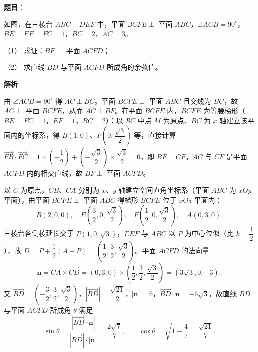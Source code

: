 \begin{answer}

\textbf{题目}：

如图，在三棱台 \(ABC-DEF\) 中，平面 \(BCFE\perp\) 平面 \(ABC\)，\(\angle ACB=90^{\circ}\)，\(BE=EF=FC=1\)，\(BC=2\)，\(AC=3\)。

（1） 求证：\(BF\perp\) 平面 \(ACFD\)；

（2） 求直线 \(BD\) 与平面 \(ACFD\) 所成角的余弦值。
\nopagebreak[4]
\begin{center}\end{center}
\nopagebreak[4]
\textbf{解析}


由 \(\angle ACB=90^{\circ}\) 得 \(AC\perp BC\)。平面 \(BCFE\perp\) 平面 \(ABC\) 且交线为 \(BC\)，故 \(AC\perp\) 平面 \(BCFE\)，从而 \(AC\perp BF\)。在平面 \(BCFE\) 内，\(BCFE\) 为等腰梯形（\(BE=FC=1\)，\(EF=1\)，\(BC=2\)）：以 \(BC\) 中点 \(M\) 为原点、\(BC\) 为 \(x\) 轴建立该平面内的坐标系，得 \(B(1,0)\)、\(F\left(0,\dfrac{\sqrt{3}}{2}\right)\) 等，直接计算 \(\overrightarrow{FB}\cdot\overrightarrow{FC}=1\times\left(-\dfrac{1}{2}\right)+\left(-\dfrac{\sqrt{3}}{2}\right)\times\dfrac{\sqrt{3}}{2}=0\)，即 \(BF\perp CF\)。\(AC\) 与 \(CF\) 是平面 \(ACFD\) 内的相交直线，故 \(BF\perp\) 平面 \(ACFD\)。


以 \(C\) 为原点，\(CB\)、\(CA\) 分别为 \(x\)、\(y\) 轴建立空间直角坐标系（平面 \(ABC\) 为 \(xOy\) 平面），由平面 \(BCFE\perp\) 平面 \(ABC\) 得梯形 \(BCFE\) 位于 \(xOz\) 平面内：
\nopagebreak[4]
\[
B(2,0,0),\quad E\left(\frac{3}{2},0,\frac{\sqrt{3}}{2}\right),\quad F\left(\frac{1}{2},0,\frac{\sqrt{3}}{2}\right),\quad A(0,3,0).
\]
三棱台各侧棱延长交于 \(P(1,0,\sqrt{3})\)，\(DEF\) 与 \(ABC\) 以 \(P\) 为中心位似（比 \(k=\dfrac{1}{2}\)），故 \(D=P+\dfrac{1}{2}(A-P)=\left(\dfrac{1}{2},\dfrac{3}{2},\dfrac{\sqrt{3}}{2}\right)\)。平面 \(ACFD\) 的法向量
\nopagebreak[4]
\[
\boldsymbol{n}=\overrightarrow{CA}\times\overrightarrow{CD}=(0,3,0)\times\left(\frac{1}{2},\frac{3}{2},\frac{\sqrt{3}}{2}\right)=(3\sqrt{3},0,-3),
\]
又 \(\overrightarrow{BD}=\left(-\dfrac{3}{2},\dfrac{3}{2},\dfrac{\sqrt{3}}{2}\right)\)，\(|\overrightarrow{BD}|=\dfrac{\sqrt{21}}{2}\)，\(|\boldsymbol{n}|=6\)，\(\overrightarrow{BD}\cdot\boldsymbol{n}=-6\sqrt{3}\)，故直线 \(BD\) 与平面 \(ACFD\) 所成角 \(\theta\) 满足
\nopagebreak[4]
\[
\sin\theta=\frac{|\overrightarrow{BD}\cdot\boldsymbol{n}|}{|\overrightarrow{BD}|\cdot|\boldsymbol{n}|}=\frac{2\sqrt{7}}{7},
\qquad
\cos\theta=\sqrt{1-\frac{4}{7}}=\frac{\sqrt{21}}{7}.
\]



\end{answer}
